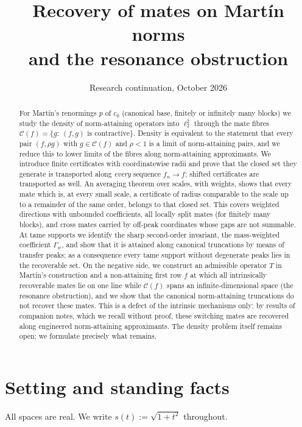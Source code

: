 \documentclass[10pt]{amsart}
\title{Recovery of mates on Mart\'in norms\\and the resonance obstruction}
\author{}
\date{Research continuation, October 2026}
\theoremstyle{definition}
\theoremstyle{remark}
\newcommand{\Cset}{\mathcal C}
\begin{document}
\begin{abstract}
For Mart\'in's renormings $p$ of $c_0$ (canonical base, finitely or
infinitely many blocks) we study the density of norm-attaining operators
into $\ell_2^2$ through the mate fibres
$\Cset(f)=\{g:\ (f,g)\text{ is contractive}\}$.  Density is equivalent to the
statement that every pair $(f,\rho g)$ with $g\in\Cset(f)$ and $\rho<1$ is a
limit of norm-attaining pairs, and we reduce this to lower limits of the
fibres along norm-attaining approximants.  We introduce finite
certificates with coordinatewise radii and prove that the closed set they
generate is transported along \emph{every} sequence $f_n\to f$; shifted
certificates are transported as well.  An averaging theorem over scales,
with weights, shows that every mate which is, at every small scale, a
certificate of radius comparable to the scale up to a remainder of the same
order, belongs to that closed set.  This covers weighted directions with
unbounded coefficients, all locally split mates (for finitely many
blocks), and cross mates carried by
off-peak coordinates whose gaps are not summable.  At tame supports we
identify the sharp second-order invariant, the mass-weighted coefficient
$\Gamma_w$, and show that it is attained along canonical truncations by
means of transfer peaks; as a consequence every tame support without
degenerate peaks lies in the recoverable set.  On the negative side, we
construct an admissible operator $T$ in Mart\'in's construction and a
non-attaining first row $f$ at which all intrinsically recoverable mates
lie on one line while $\Cset(f)$ spans an infinite-dimensional space (the
resonance obstruction), and we show that the canonical norm-attaining
truncations do not recover these mates.  This is a defect of the intrinsic
mechanisms only: by results of companion notes, which we recall without
proof, these switching mates are recovered along engineered
norm-attaining approximants.  The density problem itself remains open; we
formulate precisely what remains.
\end{abstract}
\maketitle
\tableofcontents

\section{Setting and standing facts}\label{sec:setting}

All spaces are real.  We write $s(t):=\sqrt{1+t^2}$ throughout.
\end{document}
